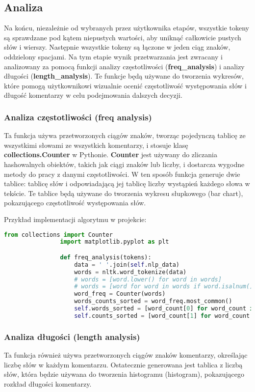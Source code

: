 	
	\subsection{Analiza}
		Na końcu, niezależnie od wybranych przez użytkownika etapów, wszystkie tokeny są sprawdzane pod kątem niepustych wartości, aby uniknąć całkowicie pustych słów i wierszy. Następnie wszystkie tokeny są łączone w jeden ciąg znaków, oddzielony spacjami. Na tym etapie wynik przetwarzania jest zwracany i analizowany za pomocą funkcji analizy częstotliwości (\textbf{freq\_analysis}) i analizy długości (\textbf{length\_analysis}). Te funkcje będą używane do tworzenia wykresów, które pomogą użytkownikowi wizualnie ocenić częstotliwość występowania słów i długość komentarzy w celu podejmowania dalszych decyzji.
	
		\subsubsection{Analiza częstotliwości (freq analysis)}
			Ta funkcja używa przetworzonych ciągów znaków, tworząc pojedynczą tablicę ze wszystkimi słowami ze wszystkich komentarzy, i stosuje klasę \textbf{collections.Counter} w Pythonie. \textbf{Counter} jest używany do zliczania hashowalnych obiektów, takich jak ciągi znaków lub liczby, i dostarcza wygodne metody do pracy z danymi częstotliwości. W ten sposób funkcja generuje dwie tablice: tablicę słów i odpowiadającą jej tablicę liczby wystąpień każdego słowa w tekście. Te tablice będą używane do tworzenia wykresu słupkowego (bar chart), pokazującego częstotliwość występowania słów.
			
			Przykład implementacji algorytmu w projekcie:
			\begin{lstlisting}[language=Python]
				from collections import Counter
				import matplotlib.pyplot as plt

				def freq_analysis(tokens):
					data = ' '.join(self.nlp_data)
					words = nltk.word_tokenize(data)
					# words = [word.lower() for word in words]
					# words = [word for word in words if word.isalnum()]
					word_freq = Counter(words)
					words_counts_sorted = word_freq.most_common()
					self.words_sorted = [word_count[0] for word_count in words_counts_sorted]
					self.counts_sorted = [word_count[1] for word_count in words_counts_sorted]
			\end{lstlisting}
		
		\subsubsection{Analiza długości (length analysis)}
			Ta funkcja również używa przetworzonych ciągów znaków komentarzy, określając liczbę słów w każdym komentarzu. Ostatecznie generowana jest tablica z liczbą słów, która będzie używana do tworzenia histogramu (histogram), pokazującego rozkład długości komentarzy.
			
